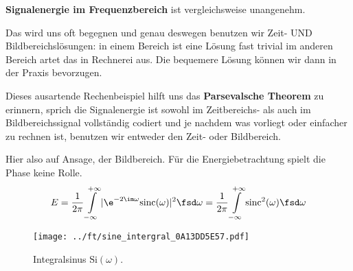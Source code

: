 \begin{Ansatz}
\textbf{Signalenergie im Frequenzbereich} ist vergleichsweise unangenehm.

Das wird uns oft begegnen und genau deswegen benutzen wir Zeit- UND
Bildbereichslösungen:
in einem Bereich ist eine Lösung fast trivial im anderen Bereich artet das in
 Rechnerei aus.
%
Die bequemere Lösung können wir dann in der Praxis bevorzugen.
%

Dieses ausartende Rechenbeispiel hilft uns das \textbf{Parsevalsche Theorem}
zu erinnern, sprich die Signalenergie ist sowohl im Zeitbereichs- als auch im
Bildbereichssignal vollständig codiert und je nachdem was vorliegt oder einfacher
zu rechnen ist, benutzen wir entweder den Zeit- oder Bildbereich.

Hier also auf Ansage, der Bildbereich. Für die Energiebetrachtung spielt die
Phase keine Rolle.
\begin{align}
\label{eq:0A13DD5E57_Energie_Freq_Ansatz}
E = \frac{1}{2\pi}\int\limits_{-\infty}^{+\infty} |\e^{-2 \im \omega} \mathrm{sinc}(\omega)|^2 \fsd \omega
=\frac{1}{2\pi}\int\limits_{-\infty}^{+\infty} \mathrm{sinc}^2(\omega) \fsd \omega
\end{align}

\end{Ansatz}

\begin{figure}
\centering
\texttt{[image: ../ft/sine\_intergral\_0A13DD5E57.pdf]}
\caption{Integralsinus $\mathrm{Si}(\omega)$.}
\label{fig:sine_intergral_0A13DD5E57}
\end{figure}


